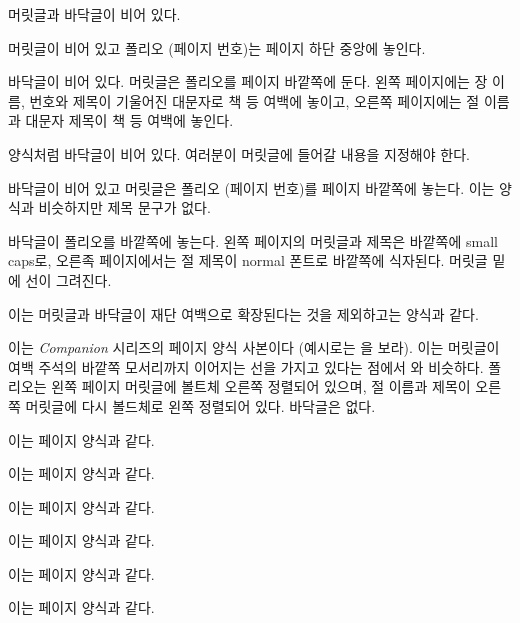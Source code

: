 \begin{plainlist}
\item[\pstyle{empty}] 머릿글과 바닥글이
  비어 있다.
\item[\pstyle{plain}] 머릿글이 비어 있고
     폴리오 (페이지 번호)는 페이지 하단 중앙에 놓인다.
\item[\pstyle{headings}] 바닥글이 비어 있다.
     머릿글은 폴리오를 페이지 바깥쪽에
     둔다. 왼쪽 페이지에는 장 이름, 번호와 제목이 기울어진 대문자로 책 등
     여백에 놓이고, 오른쪽 페이지에는 절 이름과 대문자 제목이 책 등 여백에
     놓인다.
\item[\pstyle{myheadings}]  양식처럼 바닥글이 비어 있다.
     여러분이 머릿글에 들어갈 내용을 지정해야 한다.
\item[\pstyle{simple}] 바닥글이 비어 있고
     머릿글은 폴리오 (페이지 번호)를
     페이지 바깥쪽에 놓는다.
     이는  양식과 비슷하지만 제목 문구가 없다.
\item[\pstyle{ruled}] 바닥글이
     폴리오를 바깥쪽에 놓는다.
     왼쪽 페이지의 머릿글과 제목은 바깥쪽에 small caps로,
     오른족 페이지에서는 절 제목이 normal 폰트로 바깥쪽에 식자된다.
     머릿글 밑에 선이 그려진다.
\item[\pstyle{Ruled}] 이는 머릿글과
     바닥글이 재단
     여백으로 확장된다는 것을
     제외하고는  양식과 같다.
 \item[\pstyle{companion}] 이는 \textit{Companion} 시리즈의 페이지 양식
     사본이다 (예시로는 \cite{COMPANION}을 보라).
     이는 머릿글이 여백 주석의 바깥쪽 모서리까지 이어지는 선을 가지고 있다는
     점에서 와 비슷하다.
     폴리오는 왼쪽 페이지 머릿글에 볼트체 오른쪽 정렬되어 있으며, 절 이름과
     제목이 오른쪽 머릿글에 다시 볼드체로 왼쪽 정렬되어
     있다.
     바닥글은 없다.
\item[\pstyle{book}] 이는  페이지 양식과 같다.
\item[\pstyle{chapter}]  이는  페이지 양식과 같다.
\item[\pstyle{cleared}]  이는  페이지 양식과 같다.
\item[\pstyle{part}] 이는  페이지 양식과 같다.
\item[\pstyle{title}] 이는  페이지 양식과 같다.
\item[\pstyle{titlingpage}] 이는  페이지 양식과 같다.
\end{plainlist}

